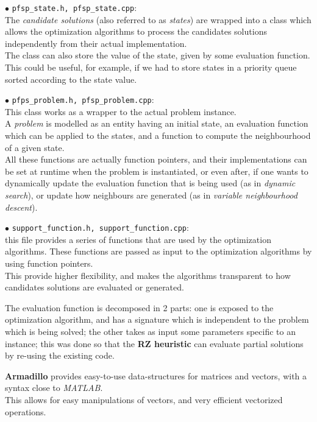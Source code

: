 \documentclass[
12pt,
a4paper,
oneside,
headinclude,
footinclude]{article}
\theoremstyle{definition} %
\begin{document}
$\bullet$ \texttt{pfsp\_state.h, pfsp\_state.cpp}: \\
The \textit{candidate solutions} (also referred to as \textit{states}) are wrapped into a class which allows the optimization algorithms to process the candidates solutions independently from their actual implementation.\\
The class can also store the value of the state, given by some evaluation function.\\
This could be useful, for example, if we had to store states in a priority queue sorted according to the state value.

$\bullet$ \texttt{pfps\_problem.h, pfsp\_problem.cpp}:\\
This class works as a wrapper to the actual problem instance. \\
A \textit{problem} is modelled as an entity having an initial state, an evaluation function which can be applied to the states, and a function to compute the neighbourhood of a given state. \\
All these functions are actually function pointers, and their implementations can be set at runtime when the problem is instantiated, or even after, if one wants to dynamically update the evaluation function that is being used (as in \textit{dynamic search}), or update how neighbours are generated (as in \textit{variable neighbourhood descent}).

$\bullet$ \texttt{support\_function.h, support\_function.cpp}: \\
this file provides a series of functions that are used by the optimization algorithms.
These functions are passed as input to the optimization algorithms by using function pointers. \\
This provide higher flexibility, and makes the algorithms transparent to how candidates solutions are evaluated or generated.

The evaluation function is decomposed in 2 parts: one is exposed to the optimization algorithm, and has a signature which is independent to the problem which is being solved; the other takes as input some parameters specific to an instance; this was done so that the \textbf{RZ heuristic} can evaluate partial solutions by re-using the existing code. 

\textbf{Armadillo} provides easy-to-use data-structures for matrices and vectors, with a syntax close to \textit{MATLAB}.\\
This allows for easy manipulations of vectors, and very efficient vectorized operations.
\end{document}
